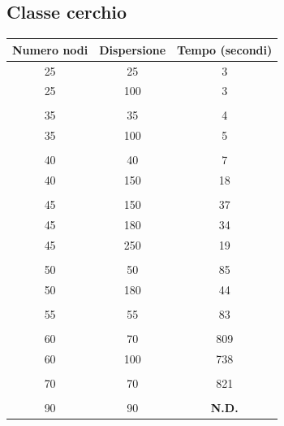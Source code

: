 \documentclass{article}
\begin{document}
\subsection{Classe cerchio}
\begin{table}[h]
\centering
\begin{tabular}{c | c | c}
\hline \hline
\textbf{Numero nodi} & \textbf{Dispersione} & \textbf{Tempo (secondi)} \\
\hline
25 & 25 & 3 \\
\hline
25 & 100 & 3 \\ \\
\hline
\hline
35 & 35 & 4 \\
\hline
35 & 100 & 5 \\ \\
\hline
\hline
40 & 40 & 7 \\
\hline
40 & 150 & 18 \\ \\
\hline
\hline
45 & 150 & 37 \\
\hline
45 & 180 & 34 \\
\hline
45 & 250 & 19 \\ \\
\hline
\hline
50 & 50 & 85 \\
\hline
50 & 180 & 44 \\ \\
\hline
\hline
55 & 55 & 83  \\ \\
\hline
\hline
60 & 70 & 809  \\
\hline
60 & 100 & 738   \\ \\
\hline
70 & 70 & 821   \\ \\
\hline
\hline
90 & 90 & \textbf{N.D.} \\
\hline
\end{tabular}
\end{table}

\newpage
\end{document}
